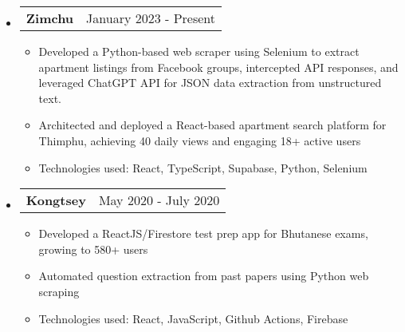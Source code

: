 \documentclass[letterpaper,11pt]{article}
\makeatletter
\newcommand{\resumeItem}[1]{
  \item\small{
    {#1 \vspace{-2pt}}
  }
}
\newcommand{\resumeProjectHeading}[2]{
    \item
    \begin{tabular*}{0.97\textwidth}{l@{\extracolsep{\fill}}r}
      \small#1 & #2 \\
    \end{tabular*}\vspace{-7pt}
}
\newcommand{\resumeSubHeadingListStart}{\begin{itemize}[leftmargin=0.15in, label={}]}
\newcommand{\resumeSubHeadingListEnd}{\end{itemize}}
\newcommand{\resumeItemListStart}{\begin{itemize}}
\newcommand{\resumeItemListEnd}{\end{itemize}\vspace{-5pt}}
\makeatother
\begin{document}
\resumeSubHeadingListStart

\resumeProjectHeading
          {\textbf{Zimchu}}{January 2023 - Present}
          \resumeItemListStart
            \resumeItem{Developed a Python-based web scraper using Selenium to extract apartment listings from Facebook groups, intercepted API responses, and leveraged ChatGPT API for JSON data extraction from unstructured text.}
            \resumeItem{Architected and deployed a React-based apartment search platform for Thimphu, achieving 40 daily views and engaging 18+ active users}
            \resumeItem{Technologies used: React, TypeScript, Supabase, Python, Selenium}
          \resumeItemListEnd

      \resumeProjectHeading
          {\textbf{Kongtsey}}{May 2020 - July 2020}
          \resumeItemListStart
            \resumeItem{Developed a ReactJS/Firestore test prep app for Bhutanese exams, growing to 580+ users}
            \resumeItem{Automated question extraction from past papers using Python web scraping}
            \resumeItem{Technologies used: React, JavaScript, Github Actions, Firebase}
          \resumeItemListEnd
    \resumeSubHeadingListEnd
\end{document}
